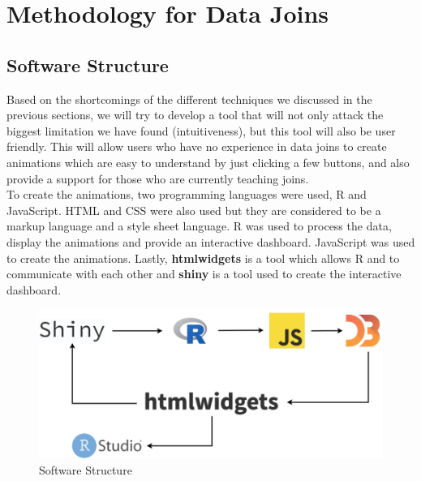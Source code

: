 
\chapter{Methodology for Data Joins} \label{c2} %



\newcommand{\keyword}[1]{\textbf{#1}}
\newcommand{\tabhead}[1]{\textbf{#1}}
\newcommand{\code}[1]{\texttt{#1}}
\newcommand{\file}[1]{\texttt{\bfseries#1}}
\newcommand{\option}[1]{\texttt{\itshape#1}}

\section{Software Structure}\label{s2.ss}

Based on the shortcomings of the different techniques we discussed in the previous sections, we will try to develop a tool that will not only attack the biggest limitation we have found (intuitiveness), but this tool will also be user friendly. This will allow users who have no experience in data joins to create  animations which are easy to understand by just clicking a few buttons, and also provide a support for those who are currently teaching joins.  \\

To create the animations, two programming languages were used, \textsf{R} and \textsf{JavaScript}. \textsf{HTML} and \textsf{CSS} were also used but they are considered to be a markup language and a style sheet language. \textsf{R} was used to process the data, display the animations and provide an interactive dashboard. \textsf{JavaScript} was used to create the animations. Lastly, \textbf{htmlwidgets} \citep{htmlwidgets} is a tool which allows \textsf{R} and  to communicate with each other and \textbf{shiny} \citep{shiny} is a tool used to create the interactive dashboard.

\begin{figure}[H]
    \centering
    \includegraphics[scale = 0.9]{Masters-Thesis/img/softflow.png}
    \caption{Software Structure}
    \label{fig:softflow}
\end{figure}

